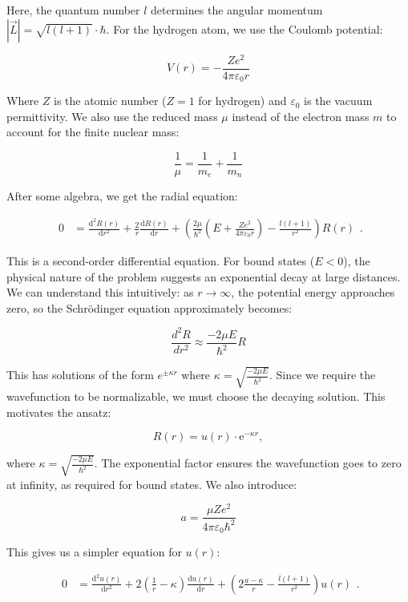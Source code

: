 \documentclass[
  a4paper,
]{book}
\begin{document}
Here, the quantum number \(l\) determines the angular momentum
\(\left| \vec{L} \right| = \sqrt{l \left( l+1 \right)} \cdot \hbar\).
For the hydrogen atom, we use the Coulomb potential:

\[
V \left( r \right) = - \frac{Z e^2}{4 \pi \varepsilon_0 r}
\]

Where \(Z\) is the atomic number (\(Z=1\) for hydrogen) and
\(\varepsilon_0\) is the vacuum permittivity. We also use the reduced
mass \(\mu\) instead of the electron mass \(m\) to account for the
finite nuclear mass:

\[\frac{1}{\mu} = \frac{1}{m_e} + \frac{1}{m_n}\]

After some algebra, we get the radial equation:

\[
\begin{aligned}
0 & =
\frac{\mathrm{d}^2 R \left( r \right)}{\mathrm{d} r^2} + \frac{2}{r} \frac{\mathrm{d} R \left( r \right)}{\mathrm{d} r}
+ \left( \frac{2\mu}{\hbar^2} \left( E + \frac{Z e^2}{4 \pi \varepsilon_0 r} \right)  - \frac{l \left( l+1 \right)}{r^2} \right) R \left( r \right)
\end{aligned} \mathrm{.}
\]

This is a second-order differential equation. For bound states
(\(E < 0\)), the physical nature of the problem suggests an exponential
decay at large distances. We can understand this intuitively: as
\(r \to \infty\), the potential energy approaches zero, so the
Schrödinger equation approximately becomes:

\[
\frac{d^2R}{dr^2} \approx \frac{-2\mu E}{\hbar^2}R
\]

This has solutions of the form \(e^{\pm \kappa r}\) where
\(\kappa = \sqrt{\frac{-2\mu E}{\hbar^2}}\). Since we require the
wavefunction to be normalizable, we must choose the decaying solution.
This motivates the ansatz:

\[
R \left( r \right) = u \left( r \right) \cdot \mathrm{e}^{- \kappa r} \mathrm{,}
\]

where \(\kappa = \sqrt{\frac{-2\mu E}{\hbar^2}}\). The exponential
factor ensures the wavefunction goes to zero at infinity, as required
for bound states. We also introduce:

\[
a = \frac{\mu Z e^2}{4 \pi \varepsilon_0 \hbar^2}
\]

This gives us a simpler equation for \(u(r)\):

\[
\begin{aligned}
0 & =
\frac{\mathrm{d}^2 u \left( r \right)}{\mathrm{d} r^2}
+ 2 \left( \frac{1}{r} - \kappa\right) \frac{\mathrm{d} u \left( r \right)}{\mathrm{d} r}
+ \left(2 \frac{a-\kappa}{r} - \frac{l \left( l+1 \right)}{r^2} \right) u \left( r \right)
\end{aligned} \mathrm{.}
\]
\end{document}
